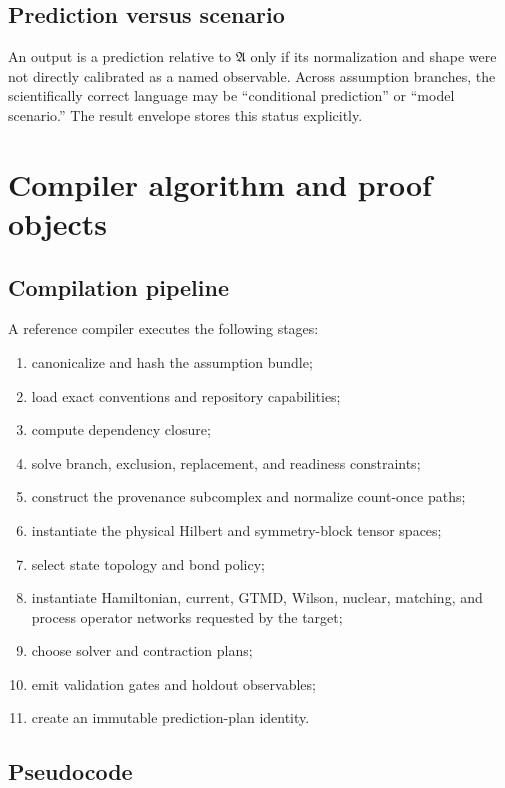 \documentclass[11pt]{article}
\newcommand{\Aset}{\mathfrak A}
\begin{document}
\subsection{Prediction versus scenario}

An output is a prediction relative to \(\Aset\) only if its normalization and
shape were not directly calibrated as a named observable.  Across assumption
branches, the scientifically correct language may be ``conditional prediction''
or ``model scenario.''  The result envelope stores this status explicitly.

\section{Compiler algorithm and proof objects}
\label{sec:compiler-algorithm}

\subsection{Compilation pipeline}

A reference compiler executes the following stages:
\begin{enumerate}
 \item canonicalize and hash the assumption bundle;
 \item load exact conventions and repository capabilities;
 \item compute dependency closure;
 \item solve branch, exclusion, replacement, and readiness constraints;
 \item construct the provenance subcomplex and normalize count-once paths;
 \item instantiate the physical Hilbert and symmetry-block tensor spaces;
 \item select state topology and bond policy;
 \item instantiate Hamiltonian, current, GTMD, Wilson, nuclear, matching, and
 process operator networks requested by the target;
 \item choose solver and contraction plans;
 \item emit validation gates and holdout observables;
 \item create an immutable prediction-plan identity.
\end{enumerate}

\subsection{Pseudocode}
\end{document}

